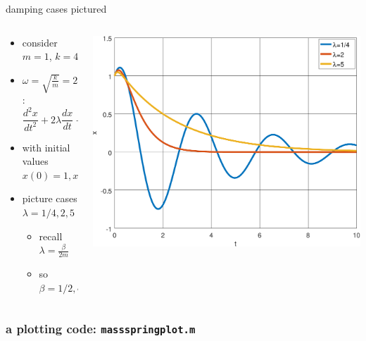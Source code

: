 \documentclass[urlcolor=blue,dvipsnames]{beamer}
\begin{document}
\begin{frame}{damping cases pictured}

\begin{columns}
\begin{column}{0.45\textwidth}
\begin{itemize}
\item consider $m=1$, $k=4$
\item $\omega=\sqrt{\frac{k}{m}} = 2$:
    $$\frac{d^2x}{dt^2} + 2 \lambda \frac{dx}{dt} + 4 x=0$$
\item with initial values $x(0)=1,x'(0)=1$
\item picture cases $\lambda=1/4,2,5$
    \begin{itemize}
    \item recall $\lambda=\frac{\beta}{2m}$
    \item so $\beta = 1/2,4,10$
    \end{itemize}
\end{itemize}
\end{column}
\begin{column}{0.55\textwidth}
\includegraphics[width=1.03\textwidth]{figs/dampingcases}
\end{column}
\end{columns}
\end{frame}


\begin{frame}[fragile]
\frametitle{a plotting code: \texttt{massspringplot.m}}

\end{frame}
\end{document}
